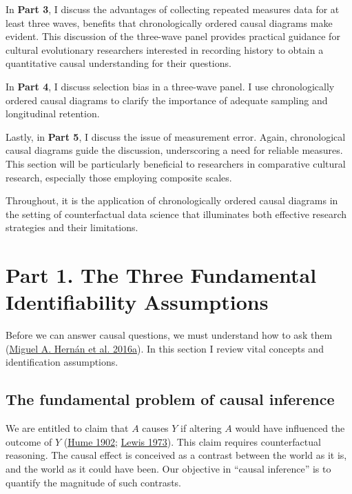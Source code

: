 \documentclass[
  singlecolumn]{report}
\begin{document}
In \textbf{Part 3}, I discuss the advantages of collecting repeated
measures data for at least three waves, benefits that chronologically
ordered causal diagrams make evident. This discussion of the three-wave
panel provides practical guidance for cultural evolutionary researchers
interested in recording history to obtain a quantitative causal
understanding for their questions.

In \textbf{Part 4}, I discuss selection bias in a three-wave panel. I
use chronologically ordered causal diagrams to clarify the importance of
adequate sampling and longitudinal retention.

Lastly, in \textbf{Part 5}, I discuss the issue of measurement error.
Again, chronological causal diagrams guide the discussion, underscoring
a need for reliable measures. This section will be particularly
beneficial to researchers in comparative cultural research, especially
those employing composite scales.

Throughout, it is the application of chronologically ordered causal
diagrams in the setting of counterfactual data science that illuminates
both effective research strategies and their limitations.

\hypertarget{part-1.-the-three-fundamental-identifiability-assumptions}{%
\section{Part 1. The Three Fundamental Identifiability
Assumptions}\label{part-1.-the-three-fundamental-identifiability-assumptions}}

Before we can answer causal questions, we must understand how to ask
them (\protect\hyperlink{ref-hernuxe1n2016b}{Miguel A. Hernán et al.
2016a}). In this section I review vital concepts and identification
assumptions.

\hypertarget{the-fundamental-problem-of-causal-inference}{%
\subsection{The fundamental problem of causal
inference}\label{the-fundamental-problem-of-causal-inference}}

We are entitled to claim that \(A\) causes \(Y\) if altering \(A\) would
have influenced the outcome of \(Y\)
(\protect\hyperlink{ref-hume1902}{Hume 1902};
\protect\hyperlink{ref-lewis1973}{Lewis 1973}). This claim requires
counterfactual reasoning. The causal effect is conceived as a contrast
between the world as it is, and the world as it could have been. Our
objective in ``causal inference'' is to quantify the magnitude of such
contrasts.
\end{document}
